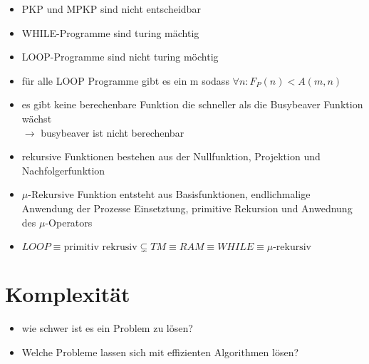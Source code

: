 \documentclass[a4paper, 10pt]{article}
\theoremstyle{definition}
\begin{document}
\begin{itemize}
\begin{itemize}
        \item nicht-trivial, es gibt TMs die diesse Eigenschaft haben und welche die sie nicht haben
        \item semantisch, die Eigenschaft hängt von der von M berechneten Funktion ab.
        \item Zeige \begin{enumerate}
            \item definiere Menge $\mathcal{S}$
            \itme Zeige $\mathcal{S}\neq\emptyset$ Bsp. $f_M(x)=42,\forall x\in\mathbb{N}$
            \item Zeige $\mathcal{S}\neq\mathcal{R}$ Bsp $f(x)=0,\forall x\in\mathbb{N}\Rightarrow x\not\in\mathcal{S}$
            \item es folgt nach SvR\footnote{Satz von Rice} das $L_{eingabe}=L(S)$ nicht entscheidbar.
        \end{enumerate}
    \end{itemize}
    \item PKP und MPKP sind nicht entscheidbar
    \item WHILE-Programme sind turing mächtig 
    \item LOOP-Programme sind nicht turing möchtig
    \item für alle LOOP Programme gibt es ein m sodass $\forall n:F_P(n)<A(m,n)$
    \item es gibt keine berechenbare Funktion die schneller als die Busybeaver Funktion wächst\\$\to$ busybeaver ist nicht berechenbar
    \item rekursive Funktionen bestehen aus der Nullfunktion, Projektion und Nachfolgerfunktion
    \item $\mu$-Rekursive Funktion entsteht aus Basisfunktionen, endlichmalige Anwendung der Prozesse Einsetztung, primitive Rekursion und Anwednung des $\mu$-Operators
    \item $LOOP\equiv \text{primitiv rekrusiv} \subsetneq TM\equiv RAM\equiv WHILE\equiv \mu\text{-rekursiv}$
\end{itemize}
\section{Komplexität}
\begin{itemize}
    \item wie schwer ist es ein Problem zu lösen?
    \item Welche Probleme lassen sich mit effizienten Algorithmen lösen?
\end{itemize}
\end{document}
